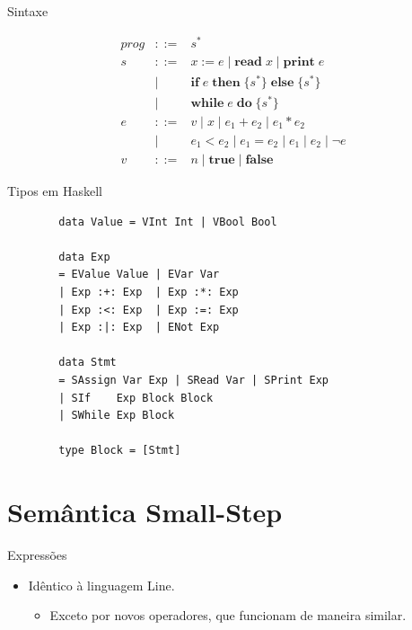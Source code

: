\begin{frame}{Sintaxe}

    \[\begin{array}{lcl}
    \mathit{prog} &::=& s^* \\[4pt]
    s &::=& x \mathbin{:=} e \mid \mathbf{read}\; x \mid \mathbf{print}\; e \\
    &\mid& \mathbf{if}\; e\; \mathbf{then}\; \{s^*\}\; \mathbf{else}\; \{s^*\} \\
    &\mid& \mathbf{while}\; e\; \mathbf{do}\; \{s^*\} \\[4pt]
    e &::=& v \mid x \mid e_1 + e_2 \mid e_1 * e_2 \\
    &\mid& e_1 < e_2 \mid e_1 = e_2 \mid e_1 \mathbin{|} e_2 \mid \neg e \\[4pt]
    v &::=& n \mid \mathbf{true} \mid \mathbf{false}
\end{array}\]
\end{frame}

\begin{frame}[fragile]{Tipos em Haskell}

    \begin{lstlisting}
        data Value = VInt Int | VBool Bool

        data Exp
        = EValue Value | EVar Var
        | Exp :+: Exp  | Exp :*: Exp
        | Exp :<: Exp  | Exp :=: Exp
        | Exp :|: Exp  | ENot Exp

        data Stmt
        = SAssign Var Exp | SRead Var | SPrint Exp
        | SIf    Exp Block Block
        | SWhile Exp Block

        type Block = [Stmt]
    \end{lstlisting}
\end{frame}


\section{Semântica Small-Step}\label{semuxe2ntica-small-step}

\begin{frame}{Expressões}

    \begin{itemize}

        \item
        Idêntico à linguagem Line.

        \begin{itemize}

            \item
            Exceto por novos operadores, que funcionam de maneira similar.
        \end{itemize}
    \end{itemize}
\end{frame}

